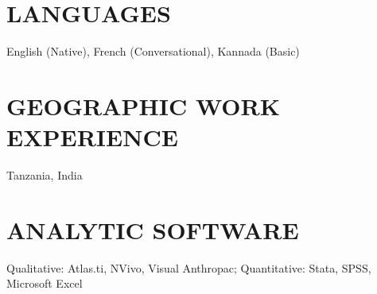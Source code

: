 \documentclass{res}
\begin{document}
\begin{resume}
\section{LANGUAGES} 
\vspace{8pt}
English (Native), French (Conversational), Kannada (Basic)

\section{GEOGRAPHIC WORK EXPERIENCE} 
\vspace{8pt}
Tanzania, India

\section{ANALYTIC SOFTWARE} 
\vspace{8pt}
Qualitative:  Atlas.ti, NVivo, Visual Anthropac;
Quantitative:  Stata, SPSS, Microsoft Excel

\end{resume} 
\end{document}
